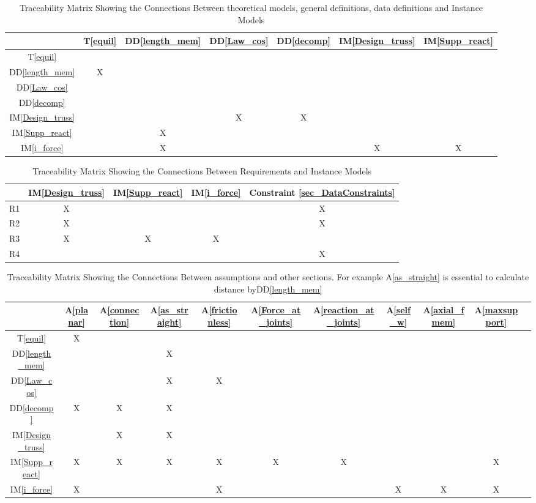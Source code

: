 \documentclass[12pt]{article}
\newcommand{\ddref}[1]{DD\ref{#1}}
\newcommand{\tref}[1]{T\ref{#1}}
\newcommand{\aref}[1]{A\ref{#1}}
\newcommand{\iref}[1]{IM\ref{#1}}
\begin{document}
\begin{table}[h!]
\centering
\begin{tabular}{|c|c|c|c|c|c|c|}
\hline
	& \tref{equil} &\ddref{length_mem}  &  \ddref{Law_cos}
  & \ddref{decomp} &\iref{Design_truss}& \iref{Supp_react} 
	  \\
\hline
\tref{equil}       & & & & & & \\ \hline
 \ddref{length_mem}   &X & & & & & \\ \hline
  \ddref{Law_cos}  & & & & & & \\ \hline
  \ddref{decomp}     & & & & & & \\ \hline
\iref{Design_truss} & & &X &X & & \\ \hline 
\iref{Supp_react} & &X & & & & \\ \hline 
\iref{i_force} & &X & & &X &X \\ \hline 
\end{tabular}
\caption{Traceability Matrix Showing the Connections Between  theoretical models, general definitions,
data definitions and Instance Models}
\label{Table:trace}
\end{table}
\begin{table}[h!]
\centering
\begin{tabular}{|c|c|c|c|c|}
\hline
	& \iref{Design_truss}& \iref{Supp_react}& 
	\iref{i_force}& Constraint \ref{sec_DataConstraints}  \\
\hline
R1      &X & & &X\\ \hline
R2    &X & &  &X\\ \hline
R3    &X &X &X&\\ \hline
R4       & & & &X\\ \hline
\end{tabular}
\caption{Traceability Matrix Showing the Connections Between Requirements and Instance Models}
\label{Table:R_trace}
\end{table}
\begin{table}[h!]
\centering
\begin{tabular}{|c|c|c|c|c|c|c|c|c|c|c|}
\hline
	& \aref{planar}& \aref{connection}& \aref{as_straight}  &\aref{frictionless} & \aref{Force_at_joints} & \aref{reaction_at_joints} & \aref{self_w} 
 & \aref{axial_fmem} &\aref{maxsupport}\\
\hline
\tref{equil}       &X & & & & & & & & \\ \hline
  \ddref{length_mem}    & & &X & & & & & & \\ \hline
  \ddref{Law_cos}     & & &X &X & & & & & \\ \hline
  \ddref{decomp}   &X &X &X & & & & & & \\ \hline
\iref{Design_truss}      & &X &X & & & & & & \\ \hline
\iref{Supp_react}      &X &X &X &X &X &X & & &X \\ \hline
\iref{i_force}      &X & & &X & & &X &X &X \\ \hline
\end{tabular}
\caption{Traceability Matrix Showing the Connections Between assumptions and other sections. For example \aref{as_straight} is essential to calculate distance by\ddref{length_mem}}
\label{Table:A_trace}
\end{table}
\end{document}
